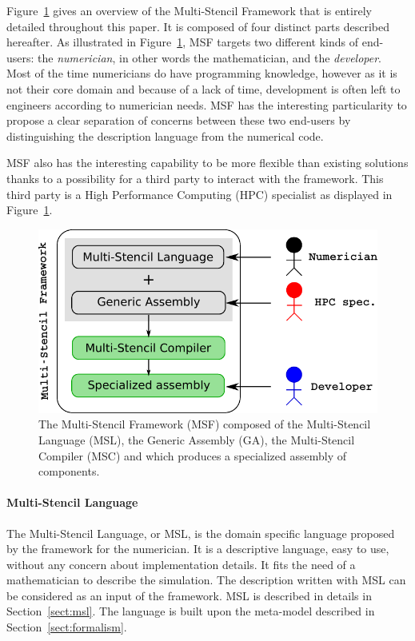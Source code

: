 Figure~\ref{fig:msf} gives an overview of the Multi-Stencil Framework that is entirely detailed throughout this paper. It is composed of four distinct parts described hereafter.
As illustrated in Figure~\ref{fig:msf}, MSF targets two different kinds of end-users: the \emph{numerician}, in other words the mathematician, and the \emph{developer}. Most of the time numericians do have programming knowledge, however as it is not their core domain and because of a lack of time, development is often left to engineers according to numerician needs. MSF has the interesting particularity to propose a clear separation of concerns between these two end-users by distinguishing the description language from the numerical code. 

MSF also has the interesting capability to be more flexible than existing solutions thanks to a possibility for a third party to interact with the framework. This third party is a High Performance Computing (HPC) specialist as displayed in Figure~\ref{fig:msf}.

\begin{figure}[t]
\begin{center}
  \includegraphics[width=.6\textwidth]{./images/msf.pdf}
  \caption{The Multi-Stencil Framework (MSF) composed of the Multi-Stencil Language (MSL), the Generic Assembly (GA), the Multi-Stencil Compiler (MSC) and which produces a specialized assembly of components.}
  \label{fig:msf}
\end{center}
\end{figure}

\paragraph{\textbf{Multi-Stencil Language}}
The Multi-Stencil Language, or MSL, is the domain specific language proposed by the framework for the numerician. It is a descriptive language, easy to use, without any concern about implementation details.
It fits the need of a mathematician to describe the simulation. The description written with MSL can be considered as an input of the framework. MSL is described in details in Section~\ref{sect:msl}. The language is built upon the meta-model described in Section~\ref{sect:formalism}.

